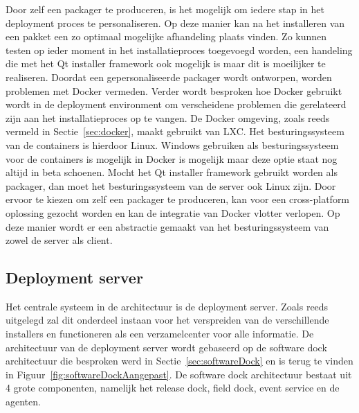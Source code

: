 Door zelf een packager te produceren, is het mogelijk om iedere stap in het deployment proces te personaliseren.
Op deze manier kan na het installeren van een pakket een zo optimaal mogelijke afhandeling plaats vinden.
Zo kunnen testen op ieder moment in het installatieproces toegevoegd worden, een handeling die met het Qt installer framework ook mogelijk is maar dit is moeilijker te realiseren.
Doordat een gepersonaliseerde packager wordt ontworpen, worden problemen met Docker vermeden.
Verder wordt besproken hoe Docker gebruikt wordt in de deployment environment om verscheidene problemen die gerelateerd zijn aan het installatieproces op te vangen.
De Docker omgeving, zoals reeds vermeld in Sectie~\vref{sec:docker}, maakt gebruikt van LXC.
Het besturingssysteem van de containers is hierdoor Linux.
Windows gebruiken als besturingssysteem voor de containers is mogelijk in Docker is mogelijk maar deze optie staat nog altijd in beta schoenen.
Mocht het Qt installer framework gebruikt worden als packager, dan moet het besturingssysteem van de server ook Linux zijn.
Door ervoor te kiezen om zelf een packager te produceren, kan voor een cross-platform oplossing gezocht worden en kan de integratie van Docker vlotter verlopen.
Op deze manier wordt er een abstractie gemaakt van het besturingssysteem van zowel de server als client.

\subsection{Deployment server}
Het centrale systeem in de architectuur is de deployment server.
Zoals reeds uitgelegd zal dit onderdeel instaan voor het verspreiden van de verschillende installers en functioneren als een verzamelcenter voor alle informatie.
De architectuur van de deployment server wordt gebaseerd op de software dock architectuur die besproken werd in Sectie~\vref{sec:softwareDock} en is terug te vinden in Figuur~\vref{fig:softwareDockAangepast}.
De software dock architectuur bestaat uit 4 grote componenten, namelijk het release dock, field dock, event service en de agenten.

